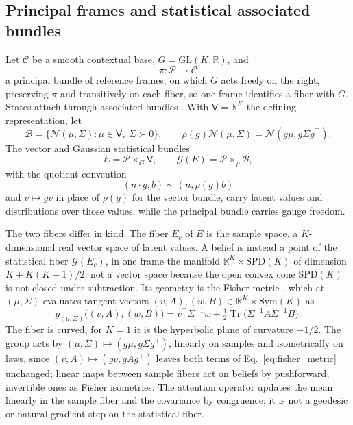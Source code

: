 \documentclass[twoside,11pt]{article}
\begin{document}
\subsection{Principal frames and statistical associated bundles}
\label{sec:principal_construction}

Let \(\mathcal C\) be a smooth contextual base, \(G=\mathrm{GL}(K,\mathbb R)\), and
\begin{equation}
\pi:\mathcal P\longrightarrow\mathcal C
\label{eq:principal_bundle}
\end{equation}
a principal bundle of reference frames, on which \(G\) acts freely on the right, preserving \(\pi\) and transitively on each fiber, so one frame identifies a fiber with \(G\). States attach through associated bundles \citep{nakahara2003geometry,frankel2011geometry}. With \(\mathsf V=\mathbb R^K\) the defining representation, let
\begin{equation}
\mathcal B=\{\mathcal N(\mu,\Sigma):\mu\in\mathsf V,\ \Sigma\succ0\},
\qquad
\rho(g)\mathcal N(\mu,\Sigma)=\mathcal N(g\mu,g\Sigma g^\top).
\label{eq:gaussian_associated_action}
\end{equation}
The vector and Gaussian statistical bundles
\begin{equation}
E=\mathcal P\times_G\mathsf V,
\qquad
\mathcal G(E)=\mathcal P\times_\rho\mathcal B,
\label{eq:associated_state_bundles}
\end{equation}
with the quotient convention
\begin{equation}
(n\cdot g,b)\sim(n,\rho(g)b)
\label{eq:associated_quotient}
\end{equation}
and \(v\mapsto gv\) in place of \(\rho(g)\) for the vector bundle, carry latent values and distributions over those values, while the principal bundle carries gauge freedom.

The two fibers differ in kind. The fiber \(E_c\) of \(E\) is the sample space, a \(K\)-dimensional real vector space of latent values. A belief is instead a point of the statistical fiber \(\mathcal G(E_c)\), in one frame the manifold \(\mathbb R^K\times\mathrm{SPD}(K)\) of dimension \(K+K(K+1)/2\), not a vector space because the open convex cone \(\mathrm{SPD}(K)\) is not closed under subtraction. Its geometry is the Fisher metric \citep{AmariNagaoka2000,Skovgaard1984}, which at \((\mu,\Sigma)\) evaluates tangent vectors \((v,A),(w,B)\in\mathbb R^K\times\mathrm{Sym}(K)\) as
\begin{equation}
g_{(\mu,\Sigma)}\bigl((v,A),(w,B)\bigr)=v^\top\Sigma^{-1}w+\tfrac12\operatorname{Tr}\bigl(\Sigma^{-1}A\Sigma^{-1}B\bigr).
\label{eq:fisher_metric}
\end{equation}
The fiber is curved; for \(K=1\) it is the hyperbolic plane of curvature \(-1/2\). The group acts by \((\mu,\Sigma)\mapsto(g\mu,g\Sigma g^\top)\), linearly on samples and isometrically on laws, since \((v,A)\mapsto(gv,gAg^\top)\) leaves both terms of Eq.~\eqref{eq:fisher_metric} unchanged; linear maps between sample fibers act on beliefs by pushforward, invertible ones as Fisher isometries. The attention operator updates the mean linearly in the sample fiber and the covariance by congruence; it is not a geodesic or natural-gradient step on the statistical fiber.
\end{document}
